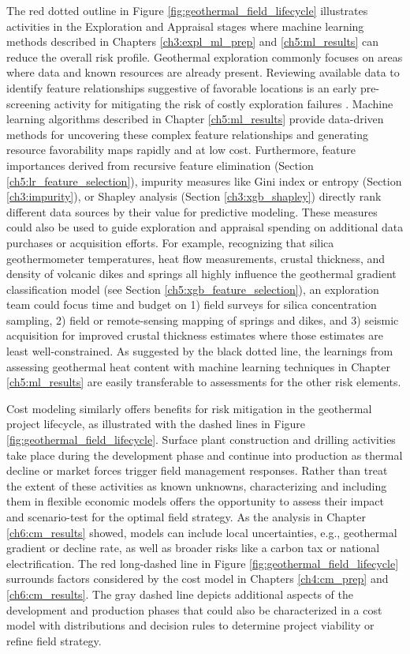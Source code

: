 The red dotted outline in Figure \ref{fig:geothermal_field_lifecycle} illustrates activities in the Exploration and Appraisal stages where machine learning methods described in Chapters \ref{ch3:expl_ml_prep} and \ref{ch5:ml_results} can reduce the overall risk profile. Geothermal exploration commonly focuses on areas where data and known resources are already present. Reviewing available data to identify feature relationships suggestive of favorable locations is an early pre-screening activity for mitigating the risk of costly exploration failures \citep{doughty_geovision_2018}. Machine learning algorithms described in Chapter \ref{ch5:ml_results} provide data-driven methods for uncovering these complex feature relationships and generating resource favorability maps rapidly and at low cost. Furthermore, feature importances derived from recursive feature elimination (Section \ref{ch5:lr_feature_selection}), impurity measures like Gini index or entropy (Section \ref{ch3:impurity}), or Shapley analysis (Section \ref{ch3:xgb_shapley}) directly rank different data sources by their value for predictive modeling. These measures could also be used to guide exploration and appraisal spending on additional data purchases or acquisition efforts. For example, recognizing that silica geothermometer temperatures, heat flow measurements, crustal thickness, and density of volcanic dikes and springs all highly influence the geothermal gradient classification model (see Section \ref{ch5:xgb_feature_selection}), an exploration team could focus time and budget on 1) field surveys for silica concentration sampling, 2) field or remote-sensing mapping of springs and dikes, and 3) seismic acquisition for improved crustal thickness estimates where those estimates are least well-constrained. As suggested by the black dotted line, the learnings from assessing geothermal heat content with machine learning techniques in Chapter \ref{ch5:ml_results} are easily transferable to assessments for the other risk elements. 

Cost modeling similarly offers benefits for risk mitigation in the geothermal project lifecycle, as illustrated with the dashed lines in Figure \ref{fig:geothermal_field_lifecycle}. Surface plant construction and drilling activities take place during the development phase and continue into production as thermal decline or market forces trigger field management responses. Rather than treat the extent of these activities as known unknowns, characterizing and including them in flexible economic models offers the opportunity to assess their impact and scenario-test for the optimal field strategy. As the analysis in Chapter \ref{ch6:cm_results} showed, models can include local uncertainties, e.g., geothermal gradient or decline rate, as well as broader risks like a carbon tax or national electrification. The red long-dashed line in Figure \ref{fig:geothermal_field_lifecycle} surrounds factors considered by the cost model in Chapters \ref{ch4:cm_prep} and \ref{ch6:cm_results}. The gray dashed line depicts additional aspects of the development and production phases that could also be characterized in a cost model with distributions and decision rules to determine project viability or refine field strategy.

